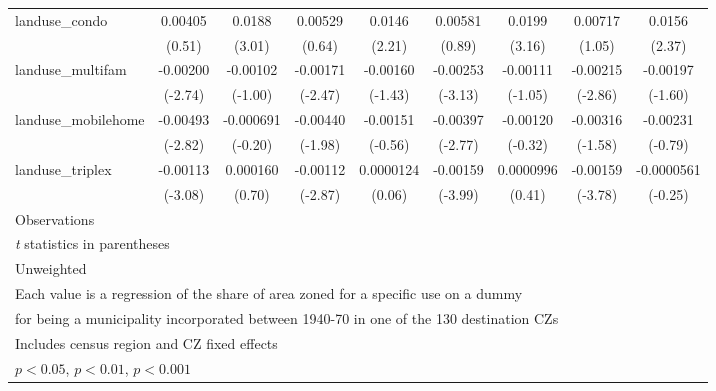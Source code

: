 \begin{table}[htbp]
\begin{tabular}{l*{8}{c}}
\addlinespace
landuse\_condo       &     0.00405         &      0.0188\sym{**} &     0.00529         &      0.0146\sym{*}  &     0.00581         &      0.0199\sym{**} &     0.00717         &      0.0156\sym{*}  \\
                    &      (0.51)         &      (3.01)         &      (0.64)         &      (2.21)         &      (0.89)         &      (3.16)         &      (1.05)         &      (2.37)         \\
\addlinespace
landuse\_multifam    &    -0.00200\sym{**} &    -0.00102         &    -0.00171\sym{*}  &    -0.00160         &    -0.00253\sym{**} &    -0.00111         &    -0.00215\sym{**} &    -0.00197         \\
                    &     (-2.74)         &     (-1.00)         &     (-2.47)         &     (-1.43)         &     (-3.13)         &     (-1.05)         &     (-2.86)         &     (-1.60)         \\
\addlinespace
landuse\_mobilehome  &    -0.00493\sym{**} &   -0.000691         &    -0.00440\sym{*}  &    -0.00151         &    -0.00397\sym{**} &    -0.00120         &    -0.00316         &    -0.00231         \\
                    &     (-2.82)         &     (-0.20)         &     (-1.98)         &     (-0.56)         &     (-2.77)         &     (-0.32)         &     (-1.58)         &     (-0.79)         \\
\addlinespace
landuse\_triplex     &    -0.00113\sym{**} &    0.000160         &    -0.00112\sym{**} &   0.0000124         &    -0.00159\sym{***}&   0.0000996         &    -0.00159\sym{***}&  -0.0000561         \\
                    &     (-3.08)         &      (0.70)         &     (-2.87)         &      (0.06)         &     (-3.99)         &      (0.41)         &     (-3.78)         &     (-0.25)         \\
\midrule
Observations        &                     &                     &                     &                     &                     &                     &                     &                     \\
\bottomrule
\multicolumn{9}{l}{\footnotesize \textit{t} statistics in parentheses}\\
\multicolumn{9}{l}{\footnotesize Unweighted}\\
\multicolumn{9}{l}{\footnotesize Each value is a regression of the share of area zoned for a specific use on a dummy}\\
\multicolumn{9}{l}{\footnotesize for being a municipality incorporated between 1940-70 in one of the 130 destination CZs}\\
\multicolumn{9}{l}{\footnotesize Includes census region and CZ fixed effects}\\
\multicolumn{9}{l}{\footnotesize \sym{*} \(p<0.05\), \sym{**} \(p<0.01\), \sym{***} \(p<0.001\)}\\
\end{tabular}
\end{table}
